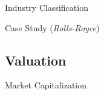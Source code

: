 \documentclass[10pt]{article}
\begin{document}
    \begin{core}{Industry Classification}





    \end{core}

    \begin{core}{Case Study (\textit{Rolls-Royce})}


    \end{core}

  \subsection{Valuation}

    \begin{core}{Market Capitalization}



    \end{core}
\end{document}
